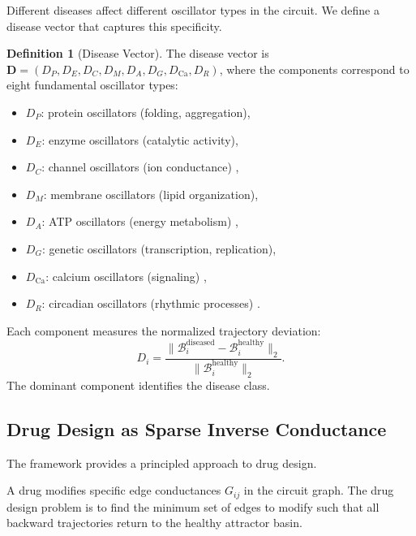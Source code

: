 \documentclass[twocolumn,10pt,a4paper]{article}
\theoremstyle{definition}
\newtheorem{definition}[theorem]{Definition}
\theoremstyle{remark}
\newcommand{\Back}{\mathcal{B}}
\begin{document}
Different diseases affect different oscillator types in the circuit. We define a disease vector that captures this specificity.

\begin{definition}[Disease Vector]
\label{def:disease_vector}
The disease vector is $\mathbf{D} = (D_P, D_E, D_C, D_M, D_A, D_G, D_{\mathrm{Ca}}, D_R)$, where the components correspond to eight fundamental oscillator types:
\begin{itemize}[nosep]
    \item $D_P$: protein oscillators (folding, aggregation),
    \item $D_E$: enzyme oscillators (catalytic activity),
    \item $D_C$: channel oscillators (ion conductance) \citep{Hille2001},
    \item $D_M$: membrane oscillators (lipid organization),
    \item $D_A$: ATP oscillators (energy metabolism) \citep{NichollsFerguson2002},
    \item $D_G$: genetic oscillators (transcription, replication),
    \item $D_{\mathrm{Ca}}$: calcium oscillators (signaling) \citep{Murray2002},
    \item $D_R$: circadian oscillators (rhythmic processes) \citep{Strogatz1994}.
\end{itemize}
Each component measures the normalized trajectory deviation:
\begin{equation}
    D_i = \frac{\|\Back_i^{\mathrm{diseased}} - \Back_i^{\mathrm{healthy}}\|_2}{\|\Back_i^{\mathrm{healthy}}\|_2}.
    \label{eq:disease_component}
\end{equation}
The dominant component identifies the disease class.
\end{definition}



\subsection{Drug Design as Sparse Inverse Conductance}

The framework provides a principled approach to drug design.

A drug modifies specific edge conductances $G_{ij}$ in the circuit graph. The drug design problem is to find the minimum set of edges to modify such that all backward trajectories return to the healthy attractor basin.
\end{document}
